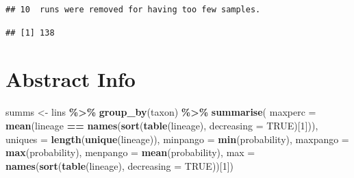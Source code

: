 \documentclass[
]{article}
\newenvironment{Shaded}{\begin{snugshade}}{\end{snugshade}}
\newcommand{\CommentTok}[1]{\textcolor[rgb]{0.56,0.35,0.01}{\textit{#1}}}
\newcommand{\DataTypeTok}[1]{\textcolor[rgb]{0.13,0.29,0.53}{#1}}
\newcommand{\DecValTok}[1]{\textcolor[rgb]{0.00,0.00,0.81}{#1}}
\newcommand{\KeywordTok}[1]{\textcolor[rgb]{0.13,0.29,0.53}{\textbf{#1}}}
\newcommand{\NormalTok}[1]{#1}
\newcommand{\OperatorTok}[1]{\textcolor[rgb]{0.81,0.36,0.00}{\textbf{#1}}}
\newcommand{\OtherTok}[1]{\textcolor[rgb]{0.56,0.35,0.01}{#1}}
\newcommand{\StringTok}[1]{\textcolor[rgb]{0.31,0.60,0.02}{#1}}
\begin{document}
\begin{verbatim}
## 10  runs were removed for having too few samples.
\end{verbatim}

\begin{Shaded}
\end{Shaded}

\begin{verbatim}
## [1] 138
\end{verbatim}

\hypertarget{abstract-info}{%
\section{Abstract Info}\label{abstract-info}}

\begin{Shaded}
\begin{Highlighting}[]
\NormalTok{summs \textless{}{-}}\StringTok{ }\NormalTok{lins }\OperatorTok{\%\textgreater{}\%}
\StringTok{    }\KeywordTok{group\_by}\NormalTok{(taxon) }\OperatorTok{\%\textgreater{}\%}
\StringTok{    }\KeywordTok{summarise}\NormalTok{(}
        \DataTypeTok{maxperc =} \KeywordTok{mean}\NormalTok{(lineage }\OperatorTok{==}\StringTok{ }\KeywordTok{names}\NormalTok{(}\KeywordTok{sort}\NormalTok{(}\KeywordTok{table}\NormalTok{(lineage),}
            \DataTypeTok{decreasing =} \OtherTok{TRUE}\NormalTok{)[}\DecValTok{1}\NormalTok{])),}
        \DataTypeTok{uniques =} \KeywordTok{length}\NormalTok{(}\KeywordTok{unique}\NormalTok{(lineage)),}
        \DataTypeTok{minpango =} \KeywordTok{min}\NormalTok{(probability),}
        \DataTypeTok{maxpango =} \KeywordTok{max}\NormalTok{(probability),}
        \DataTypeTok{menpango =} \KeywordTok{mean}\NormalTok{(probability),}
        \DataTypeTok{max =} \KeywordTok{names}\NormalTok{(}\KeywordTok{sort}\NormalTok{(}\KeywordTok{table}\NormalTok{(lineage), }\DataTypeTok{decreasing =} \OtherTok{TRUE}\NormalTok{))[}\DecValTok{1}\NormalTok{])}
\end{Highlighting}
\end{Shaded}
\end{document}
